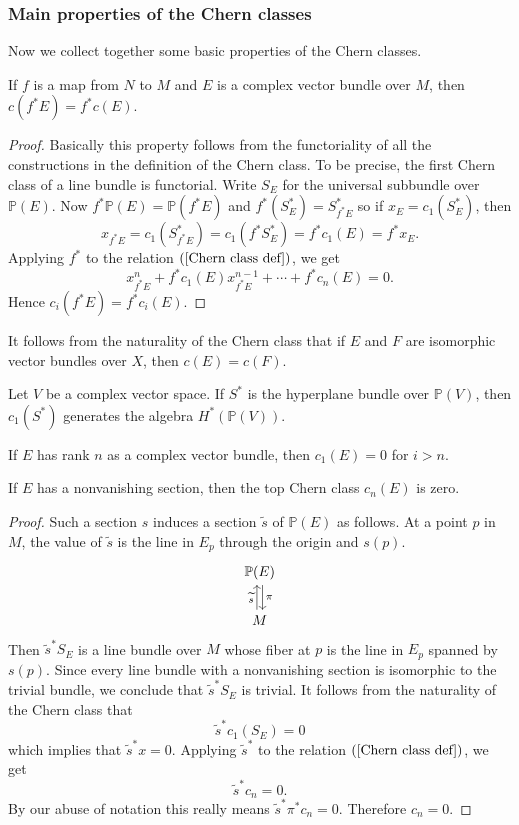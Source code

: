 \subsubsection{Main properties of the Chern classes}
Now we collect together some basic properties of the Chern classes.
\begin{proposition}
If $f$ is a map from $N$ to $M$ and $E$ is a complex vector bundle over $M$, then $c(f^*E)=f^*c(E)$.
\end{proposition}
\begin{proof}
Basically this property follows from the functoriality of all the constructions in the definition of the Chern class. To be precise, the first Chern class of a line 
bundle is functorial. Write $S_E$ for the universal subbundle over $\mathbb{P}(E)$. Now $f^*\mathbb{P}(E)=\mathbb{P}(f^*E)$ and $f^*(S_E^*)=S^*_{f^*E}$ so if 
$x_E=c_1(S^*_E)$, then
\[x_{f^*E}=c_1(S^*_{f^*E})=c_1(f^*S^*_E)=f^*c_1(E)=f^*x_E.\]
Applying $f^*$ to the relation $(\ref{Chern class def})$, we get
\[x^n_{f^*E}+f^*c_1(E)x^{n-1}_{f^*E}+\cdots+f^*c_n(E)=0.\]
Hence $c_i(f^*E)=f^*c_i(E)$.
\end{proof}
It follows from the naturality of the Chern class that if $E$ and $F$ are isomorphic vector bundles over $X$, then $c(E)=c(F)$.
\begin{proposition}
Let $V$ be a complex vector space. If $S^*$ is the hyperplane bundle over $\mathbb{P}(V)$, then $c_1(S^*)$ generates the algebra $H^*(\mathbb{P}(V))$.
\end{proposition}
\begin{proposition}
If $E$ has rank $n$ as a complex vector bundle, then $c_1(E)=0$ for $i>n$.
\end{proposition}
\begin{proposition}
If $E$ has a nonvanishing section, then the top Chern class $c_n(E)$ is zero.
\end{proposition}
\begin{proof}
Such a section $s$ induces a section $\widetilde{s}$ of $\mathbb{P}(E)$ as follows. At a point $p$ in $M$, the value of $\widetilde{s}$ is the line in $E_p$ through the 
origin and $s(p)$.
\[\begin{tikzcd}
\mathbb{P}(E)\ar[d,shift left=0.2em,"\pi"]\\
M\ar[u,shift left=0.2em,"\widetilde{s}"]
\end{tikzcd}\]
Then $\widetilde{s}^*S_E$ is a line bundle over $M$ whose fiber at $p$ is the line in $E_p$ spanned by $s(p)$. Since every line bundle with a nonvanishing section is
isomorphic to the trivial bundle, we conclude that $\widetilde{s}^*S_E$ is trivial. It follows from the naturality of the Chern class that
\[\widetilde{s}^*c_1(S_E)=0\]
which implies that $\widetilde{s}^*x=0$. Applying $\widetilde{s}^*$ to the relation $(\ref{Chern class def})$, we get
\[\widetilde{s}^*c_n=0.\]
By our abuse of notation this really means $\widetilde{s}^*\pi^*c_n=0$. Therefore $c_n=0$.
\end{proof}
